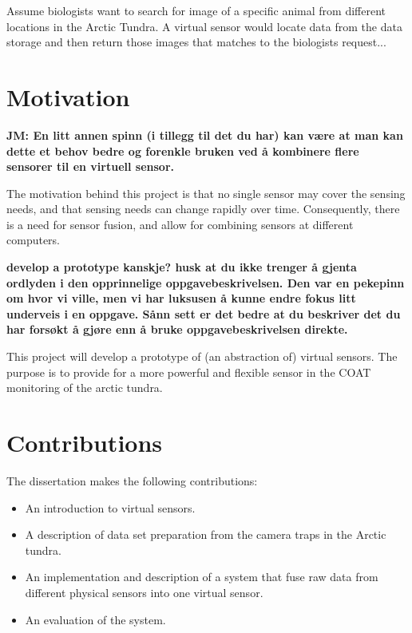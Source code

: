 \documentclass[USenglish]{uit-thesis}
\begin{document}
Assume biologists want to search for image of a specific animal from different locations in the Arctic Tundra. A virtual sensor would locate data from the data storage and then return those images that matches to the biologists request...


\section{Motivation}
\textbf{JM: En litt annen spinn (i tillegg til det du har) kan være at man kan dette et behov bedre og forenkle bruken ved å kombinere flere sensorer til en virtuell sensor.}

The motivation  behind this project is that no single sensor may cover the sensing needs, and that sensing needs can change rapidly over time. Consequently, there is a need for sensor fusion, and allow for combining sensors at different computers.


\textbf{develop a prototype kanskje? husk at du ikke trenger å gjenta ordlyden i den opprinnelige oppgavebeskrivelsen. Den var en pekepinn om hvor vi ville, men vi har luksusen å kunne endre fokus litt underveis i en oppgave. Sånn sett er det bedre at du beskriver det du har forsøkt å gjøre enn å bruke oppgavebeskrivelsen direkte.}

This project will develop a prototype of (an abstraction of) virtual sensors. The purpose is to provide for a more powerful and flexible sensor in the COAT monitoring of the arctic tundra. 


\section{Contributions}

The dissertation makes the following contributions:
\begin{itemize}
\item An introduction to virtual sensors.
\item A description of data set preparation from the camera traps in the Arctic tundra.
\item An implementation and description of a system that fuse raw data from different physical sensors into one virtual sensor.
\item An evaluation of the system.
\end{itemize}
\end{document}
